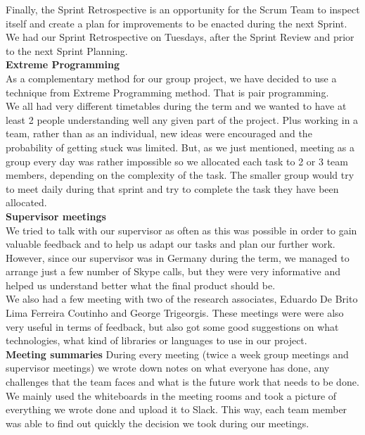 \documentclass{article}
\begin{document}
Finally, the Sprint Retrospective is an opportunity for the Scrum Team to inspect itself and create a plan for improvements to be enacted during the next Sprint. We had our Sprint Retrospective on Tuesdays, after the Sprint Review and prior to the next Sprint Planning.\\

\textbf{Extreme Programming}\\ 
As a complementary method for our group project, we have decided to use a technique from Extreme Programming method. That is pair programming. \\

We all had very different timetables during the term and we wanted to have at least 2 people understanding well any given part of the project. Plus working in a team, rather than as an individual, new ideas were encouraged and the probability of getting stuck  was limited. But, as we just mentioned, meeting as a group every day was rather impossible so we allocated each task to 2 or 3 team members, depending on the complexity of the task. The smaller group would try to meet daily during that sprint and try to complete the task they have been allocated.\\

\textbf{Supervisor meetings}\\
We tried to talk with our supervisor as often as this was possible in order to gain valuable feedback and to help us adapt our tasks and plan our further work. However, since our supervisor was in Germany during the term, we managed to arrange just a few number of Skype calls, but they were very informative and helped us understand better what the final product should be.\\

We also had a few meeting with two of the research associates, Eduardo De Brito Lima Ferreira Coutinho and George Trigeorgis. These meetings were were also very useful in terms of feedback, but also got some good suggestions on what technologies, what kind of libraries or languages to use in our project. \\

\textbf{Meeting summaries}
During every meeting (twice a week group meetings and supervisor meetings) we wrote down notes on what everyone has done, any challenges that the team faces and what is the future work that needs to be done. We mainly used the whiteboards in the meeting rooms and took a picture of everything we wrote done and upload it to Slack. This way, each team member was able to find out quickly the decision we took during our meetings.\\
	
\end{document}
